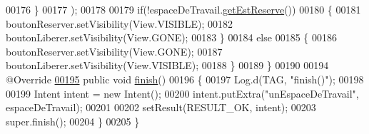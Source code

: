 \begin{DoxyCode}
00176                 \}
00177         );
00178 
00179         \textcolor{keywordflow}{if}(!espaceDeTravail.\hyperlink{classcom_1_1lasalle_1_1meeting_1_1_espace_de_travail_a69fe30f8d3aff92986f4c39402e16ab0}{getEstReserve}())
00180         \{
00181             boutonReserver.setVisibility(View.VISIBLE);
00182             boutonLiberer.setVisibility(View.GONE);
00183         \}
00184         \textcolor{keywordflow}{else}
00185         \{
00186             boutonReserver.setVisibility(View.GONE);
00187             boutonLiberer.setVisibility(View.VISIBLE);
00188         \}
00189     \}
00190 
00194     @Override
\hyperlink{classcom_1_1lasalle_1_1meeting_1_1_affichage_espace_de_travail_a2f3649336aff1f2126f817c72faf30c2}{00195}     \textcolor{keyword}{public} \textcolor{keywordtype}{void} \hyperlink{classcom_1_1lasalle_1_1meeting_1_1_affichage_espace_de_travail_a2f3649336aff1f2126f817c72faf30c2}{finish}()
00196     \{
00197         Log.d(TAG, \textcolor{stringliteral}{"finish()"});
00198 
00199         Intent intent = \textcolor{keyword}{new} Intent();
00200         intent.putExtra(\textcolor{stringliteral}{"unEspaceDeTravail"}, espaceDeTravail);
00201 
00202         setResult(RESULT\_OK, intent);
00203         super.finish();
00204     \}
00205 \}
\end{DoxyCode}
